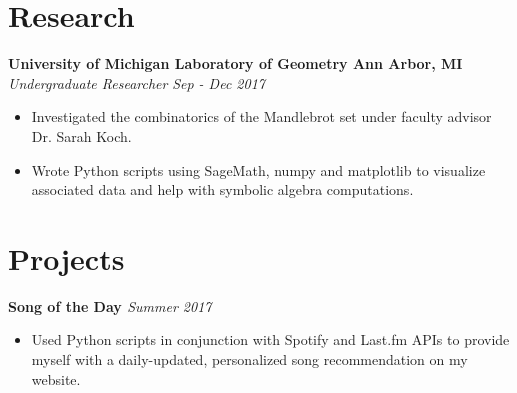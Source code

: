 \documentclass[margin,line]{resume}
\begin{document}
\begin{resume}
	
	\sectionbreak
	\vspace{-2.5mm}
	\section{\mysidestyle Research}
	\textbf{University of Michigan Laboratory of Geometry \href{https://github.com/jonathoma/LogM}{\faGithub} \hfill Ann Arbor, MI} \\\vspace{1mm}%
	\textsl{Undergraduate Researcher} \hfill \textsl{Sep - Dec 2017}
	\begin{itemize}[leftmargin=4mm]
		\item Investigated the combinatorics of the Mandlebrot set under faculty advisor Dr. Sarah Koch.
		\item Wrote Python scripts using SageMath, numpy and matplotlib to visualize associated data and help with symbolic algebra computations. 
	\end{itemize}
	\vspace{1.5mm}
	
	\sectionbreak
	\vspace{-2.5mm}
	\section{\mysidestyle Projects}
	\textbf{Song of the Day \href{https://github.com/jonathoma/songoftheday}{\faGithub}}  \hfill \textsl{Summer 2017} \vspace{1mm}%
	\begin{itemize}[leftmargin=4mm]
		\item Used Python scripts in conjunction with Spotify and Last.fm APIs to provide myself with a daily-updated, personalized song recommendation on my website.
	\end{itemize}
	\vspace{1.5mm}
	   

\end{resume}
\end{document}
